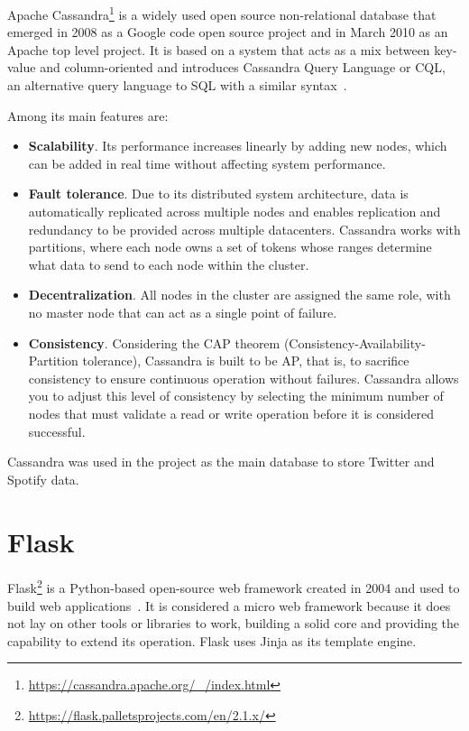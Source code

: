 \nonzeroparskip Apache Cassandra\footnote{\url{https://cassandra.apache.org/_/index.html}} is a widely used open source non-relational database that emerged in 2008 as a Google code open source project and in March 2010 as an Apache top level project. It is based on a system that acts as a mix between key-value and column-oriented and introduces Cassandra Query Language or CQL, an alternative query language to SQL with a similar syntax~\cite{cassandra,wikipedia_cassandra}.

\nonzeroparskip Among its main features are:
\begin{itemize}
	\item \textbf{Scalability}. Its performance increases linearly by adding new nodes, which can be added in real time without affecting system performance.
	\item \textbf{Fault tolerance}. Due to its distributed system architecture, data is automatically replicated across multiple nodes and enables replication and redundancy to be provided across multiple datacenters. Cassandra works with partitions, where each node owns a set of tokens whose ranges determine what data to send to each node within the cluster.
	\item \textbf{Decentralization}. All nodes in the cluster are assigned the same role, with no master node that can act as a single point of failure.
	\item \textbf{Consistency}. Considering the CAP theorem (Consistency-Availability-Partition tolerance), Cassandra is built to be AP, that is, to sacrifice consistency to ensure continuous operation without failures. Cassandra allows you to adjust this level of consistency by selecting the minimum number of nodes that must validate a read or write operation before it is considered successful.
\end{itemize}

\nonzeroparskip Cassandra was used in the project as the main database to store Twitter and Spotify data.

\section{Flask}

\nonzeroparskip Flask\footnote{\url{https://flask.palletsprojects.com/en/2.1.x/}} is a Python-based open-source web framework created in 2004 and used to build web applications~\cite{flask}. It is considered a micro web framework because it does not lay on other tools or libraries to work, building a solid core and providing the capability to extend its operation. Flask uses Jinja as its template engine.

